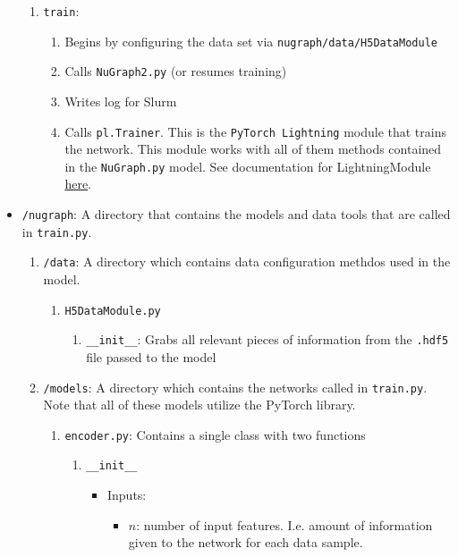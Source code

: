 \begin{itemize}
\begin{enumerate}
            \item \texttt{train}: 
                \begin{enumerate}
                    \item Begins by configuring the data set via \texttt{nugraph/data/H5DataModule}
                    \item Calls \texttt{NuGraph2.py} (or resumes training)
                    \item Writes log for Slurm
                    \item Calls \texttt{pl.Trainer}. This is the \texttt{PyTorch Lightning} module that trains the network. This module works with all of them methods contained in the \texttt{NuGraph.py} model. See documentation for LightningModule \href{https://lightning.ai/docs/pytorch/stable/common/lightning_module.html}{\color{blue} here}.
                \end{enumerate}
        \end{enumerate}

    \item \texttt{/nugraph}: A directory that contains the models and data tools that are called in \texttt{train.py}.
        \begin{enumerate}
            \item \texttt{/data}: A directory which contains data configuration methdos used in the model.
                \begin{enumerate}
                    \item \texttt{H5DataModule.py}
                        \begin{enumerate}
                            \item \texttt{\_\_init\_\_}: Grabs all relevant pieces of information from the \texttt{.hdf5} file passed to the model
                        \end{enumerate}
                \end{enumerate}
            \item \texttt{/models}: A directory which contains the networks called in \texttt{train.py}. Note that all of these models utilize the PyTorch library.
                \begin{enumerate}
                    \item \texttt{encoder.py}: Contains a single class with two functions
                        \begin{enumerate}
                            \item \texttt{\_\_init\_\_}
                            \begin{itemize}
                                \item Inputs:
                                    \begin{itemize}
                                        \item $n$: number of input features. I.e. amount of information given to the network for each data sample.


\end{itemize}
\end{itemize}
\end{enumerate}
\end{enumerate}
\end{enumerate}
\end{itemize}
